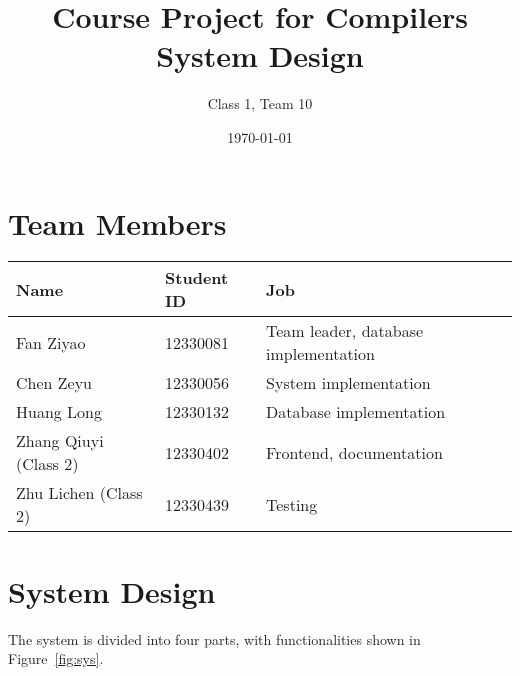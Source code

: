 \documentclass{article}
\begin{document}
\title{
Course Project for Compilers \\
System Design
}
\author{Class 1, Team 10}
\date{\today}
\maketitle
\tableofcontents
\section{Team Members}

\begin{table}[H]
\centering
\begin{tabular}{l l l}
Name & Student ID  & Job\\
\hline
Fan Ziyao & 12330081 & Team leader, database implementation\\
Chen Zeyu & 12330056 & System implementation \\
Huang Long & 12330132 & Database implementation \\
Zhang Qiuyi (Class 2) & 12330402 & Frontend, documentation \\
Zhu Lichen (Class 2) & 12330439 & Testing
\end{tabular}
\end{table}

\section{System Design}

The system is divided into four parts, with functionalities shown in Figure~\ref{fig:sys}.
\end{document}
